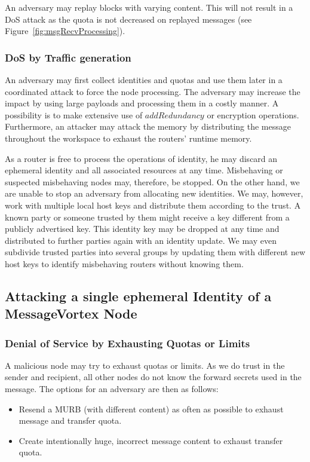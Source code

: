 An adversary may replay blocks with varying content. This will not result in a DoS attack as the quota is not decreased on replayed messages (see Figure~\ref{fig:msgRecvProcessing}).

\subsubsection{DoS by Traffic generation}
An adversary may first collect identities and quotas and use them later in a coordinated attack to force the node processing. The adversary may increase the impact by using large payloads and processing them in a costly manner. A possibility is to make extensive use of $addRedundancy$ or encryption operations. Furthermore, an attacker may attack the memory by distributing the message throughout the workspace to exhaust the routers' runtime memory.

As a router is free to process the operations of identity, he may discard an ephemeral identity and all associated resources at any time. Misbehaving or suspected misbehaving nodes may, therefore, be stopped. On the other hand, we are unable to stop an adversary from allocating new identities. We may, however, work with multiple local host keys and distribute them according to the trust. A known party or someone trusted by them might receive a key different from a publicly advertised key. This identity key may be dropped at any time and distributed to further parties again with an identity update. We may even subdivide trusted parties into several groups by updating them with different new host keys to identify misbehaving routers without knowing them. 

\subsection{Attacking a single ephemeral Identity of a MessageVortex Node}

\subsubsection{Denial of Service by Exhausting Quotas or Limits}
A malicious node may try to exhaust quotas or limits. As we do trust in the sender and recipient, all other nodes do not know the forward secrets used in the message. The options for an adversary are then as follows:

\begin{itemize}
	\item Resend a MURB (with different content) as often as possible to exhaust message and transfer quota. 
	\item Create intentionally huge, incorrect message content to exhaust transfer quota.
\end{itemize}

